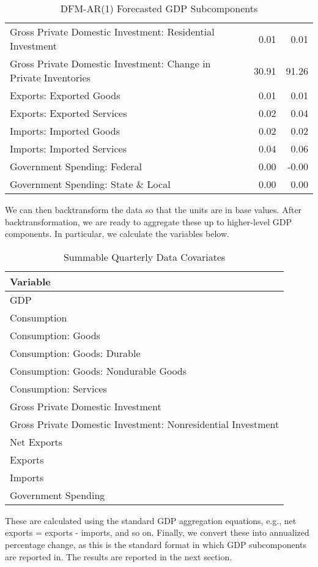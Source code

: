 \documentclass[11pt, letterpaper]{article}\usepackage[]{graphicx}\usepackage[]{color}
\begin{document}
\begin{table}[H]
\begin{tabular}{lrr}
  Gross Private Domestic Investment: Residential Investment & 0.01 & 0.01 \\ 
  Gross Private Domestic Investment: Change in Private Inventories & 30.91 & 91.26 \\ 
  Exports: Exported Goods & 0.01 & 0.01 \\ 
  Exports: Exported Services & 0.02 & 0.04 \\ 
  Imports: Imported Goods & 0.02 & 0.02 \\ 
  Imports: Imported Services & 0.04 & 0.06 \\ 
  Government Spending: Federal & 0.00 & -0.00 \\ 
  Government Spending: State \& Local & 0.00 & 0.00 \\ 
   \hline
\end{tabular}
\endgroup
\caption{DFM-AR(1) Forecasted GDP Subcomponents} 
\end{table}


We can then backtransform the data so that the units are in base values. After backtransformation, we are ready to aggregate these up to higher-level GDP components. In particular, we calculate the variables below.
\begin{table}[H]
\centering
\begingroup\scriptsize
\begin{tabular}{l}
  \hline
Variable \\ 
  \hline
GDP \\ 
  Consumption \\ 
  Consumption: Goods \\ 
  Consumption: Goods: Durable \\ 
  Consumption: Goods: Nondurable Goods \\ 
  Consumption: Services \\ 
  Gross Private Domestic Investment \\ 
  Gross Private Domestic Investment: Nonresidential Investment \\ 
  Net Exports \\ 
  Exports \\ 
  Imports \\ 
  Government Spending \\ 
   \hline
\end{tabular}
\endgroup
\caption{Summable Quarterly Data Covariates} 
\end{table}

These are calculated using the standard GDP aggregation equations, e.g., net exports = exports - imports, and so on.
Finally, we convert these into annualized percentage change, as this is the standard format in which GDP subcomponents are reported in. The results are reported in the next section.
\end{document}
